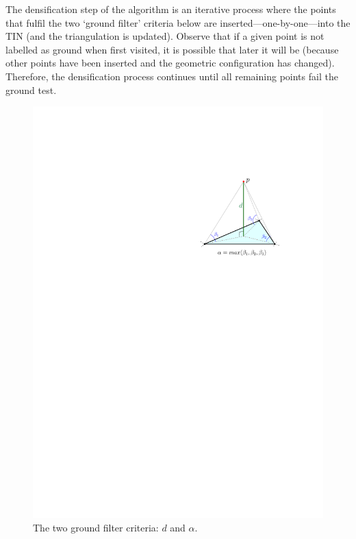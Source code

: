 The densification step of the algorithm is an iterative process where the points that fulfil the two `ground filter' criteria below are inserted---one-by-one---into the TIN (and the triangulation is updated).
Observe that if a given point is not labelled as ground when first visited, it is possible that later it will be (because other points have been inserted and the geometric configuration has changed).
Therefore, the densification process continues until all remaining points fail the ground test.
\begin{marginfigure}
  \centering
  \begin{subfigure}[b]{0.9\linewidth}
    \centering
    \includegraphics[width=\textwidth]{gftin.pdf}
    \caption{The two ground filter criteria: $d$ and $\alpha$.}\label{fig:gftin_variables}
  \end{subfigure}
  \begin{subfigure}[b]{\linewidth}

\end{subfigure}
\end{marginfigure}
